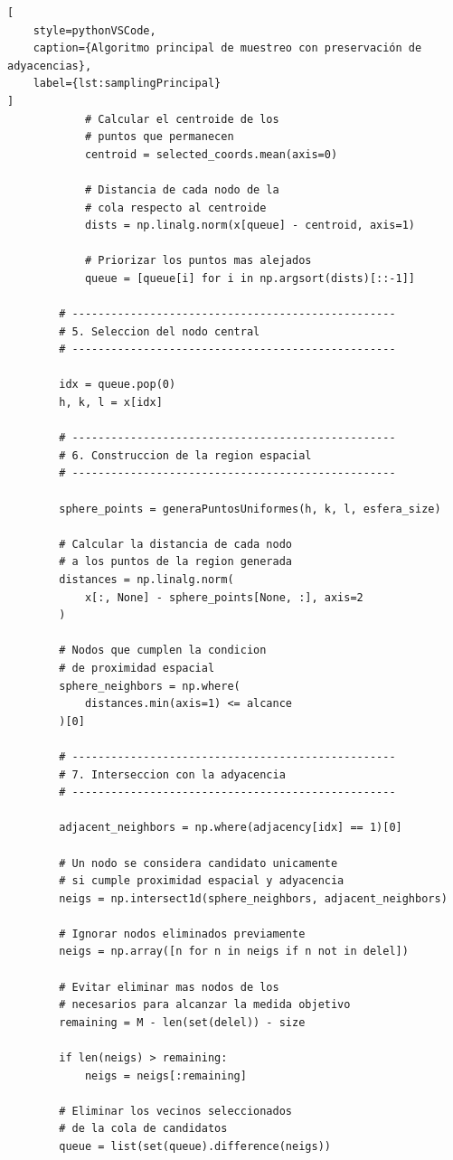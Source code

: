 \begin{lstlisting}[
    style=pythonVSCode,
    caption={Algoritmo principal de muestreo con preservación de adyacencias},
    label={lst:samplingPrincipal}
]
            # Calcular el centroide de los
            # puntos que permanecen
            centroid = selected_coords.mean(axis=0)

            # Distancia de cada nodo de la
            # cola respecto al centroide
            dists = np.linalg.norm(x[queue] - centroid, axis=1)

            # Priorizar los puntos mas alejados
            queue = [queue[i] for i in np.argsort(dists)[::-1]]

        # --------------------------------------------------
        # 5. Seleccion del nodo central
        # --------------------------------------------------

        idx = queue.pop(0)
        h, k, l = x[idx]

        # --------------------------------------------------
        # 6. Construccion de la region espacial
        # --------------------------------------------------

        sphere_points = generaPuntosUniformes(h, k, l, esfera_size)

        # Calcular la distancia de cada nodo
        # a los puntos de la region generada
        distances = np.linalg.norm(
            x[:, None] - sphere_points[None, :], axis=2
        )

        # Nodos que cumplen la condicion
        # de proximidad espacial
        sphere_neighbors = np.where(
            distances.min(axis=1) <= alcance
        )[0]

        # --------------------------------------------------
        # 7. Interseccion con la adyacencia
        # --------------------------------------------------

        adjacent_neighbors = np.where(adjacency[idx] == 1)[0]

        # Un nodo se considera candidato unicamente
        # si cumple proximidad espacial y adyacencia
        neigs = np.intersect1d(sphere_neighbors, adjacent_neighbors)

        # Ignorar nodos eliminados previamente
        neigs = np.array([n for n in neigs if n not in delel])

        # Evitar eliminar mas nodos de los
        # necesarios para alcanzar la medida objetivo
        remaining = M - len(set(delel)) - size

        if len(neigs) > remaining:
            neigs = neigs[:remaining]

        # Eliminar los vecinos seleccionados
        # de la cola de candidatos
        queue = list(set(queue).difference(neigs))


\end{lstlisting}

